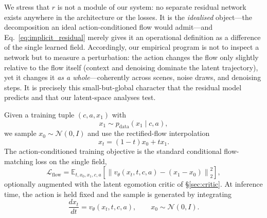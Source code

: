 \documentclass[letterpaper]{article} %
\begin{document}
We stress that $r$ is not a module of our system: no separate residual network exists anywhere in the architecture or the losses. It is the \emph{idealised} object---the decomposition an ideal action-conditioned flow would admit---and Eq.~\eqref{eq:implicit_residual} merely gives it an operational definition as a difference of the single learned field. Accordingly, our empirical program is not to inspect a network but to measure a perturbation: the action changes the flow only slightly relative to the flow itself (context and denoising dominate the latent trajectory), yet it changes it \emph{as a whole}---coherently across scenes, noise draws, and denoising steps. It is precisely this small-but-global character that the residual model predicts and that our latent-space analyses test.

Given a training tuple $(c,a,x_1)$ with
\begin{equation}
    x_1 \sim p_{\mathrm{data}}(x_1 \mid c,a),
\end{equation}
we sample $x_0 \sim \mathcal{N}(0,I)$ and use the rectified-flow interpolation
\begin{equation}
    x_t=(1-t)x_0+t x_1.
\end{equation}
The action-conditioned training objective is the standard conditional flow-matching loss on the single field,
\begin{equation}
    \mathcal{L}_{\mathrm{flow}}
    =
    \mathbb{E}_{t,x_0,x_1,c,a}
    \left[
        \left\|
        v_\theta(x_t,t,c,a)
        -
        (x_1-x_0)
        \right\|_2^2
    \right],
    \label{eq:action_conditioned_loss}
\end{equation}
optionally augmented with the latent egomotion critic of \S\ref{sec:critic}. At inference time, the action is held fixed and the sample is generated by integrating
\begin{equation}
    \frac{d x_t}{dt}
    =
    v_\theta(x_t,t,c,a),
    \qquad
    x_0 \sim \mathcal{N}(0,I).
\end{equation}
\end{document}
